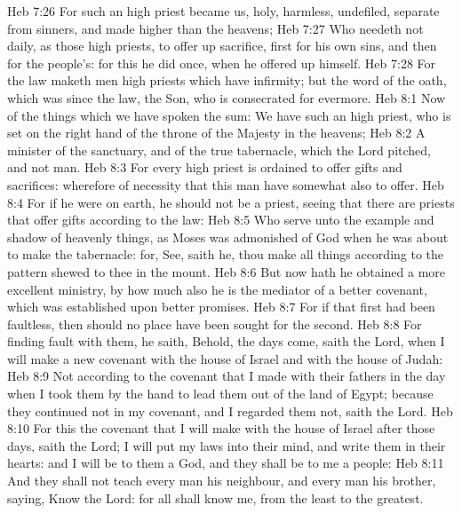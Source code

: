 \vs Heb 7:26 For such an high priest became us,  holy, harmless, undefiled, separate from sinners, and made higher than the heavens;
\vs Heb 7:27 Who needeth not daily, as those high priests, to offer up sacrifice, first for his own sins, and then for the people's: for this he did once, when he offered up himself.
\vs Heb 7:28 For the law maketh men high priests which have infirmity; but the word of the oath, which was since the law,  the Son, who is consecrated for evermore.
\vs Heb 8:1 Now of the things which we have spoken  the sum: We have such an high priest, who is set on the right hand of the throne of the Majesty in the heavens;
\vs Heb 8:2 A minister of the sanctuary, and of the true tabernacle, which the Lord pitched, and not man.
\vs Heb 8:3 For every high priest is ordained to offer gifts and sacrifices: wherefore  of necessity that this man have somewhat also to offer.
\vs Heb 8:4 For if he were on earth, he should not be a priest, seeing that there are priests that offer gifts according to the law:
\vs Heb 8:5 Who serve unto the example and shadow of heavenly things, as Moses was admonished of God when he was about to make the tabernacle: for, See, saith he,  thou make all things according to the pattern shewed to thee in the mount.
\vs Heb 8:6 But now hath he obtained a more excellent ministry, by how much also he is the mediator of a better covenant, which was established upon better promises.
\vs Heb 8:7 For if that first  had been faultless, then should no place have been sought for the second.
\vs Heb 8:8 For finding fault with them, he saith, Behold, the days come, saith the Lord, when I will make a new covenant with the house of Israel and with the house of Judah:
\vs Heb 8:9 Not according to the covenant that I made with their fathers in the day when I took them by the hand to lead them out of the land of Egypt; because they continued not in my covenant, and I regarded them not, saith the Lord.
\vs Heb 8:10 For this  the covenant that I will make with the house of Israel after those days, saith the Lord; I will put my laws into their mind, and write them in their hearts: and I will be to them a God, and they shall be to me a people:
\vs Heb 8:11 And they shall not teach every man his neighbour, and every man his brother, saying, Know the Lord: for all shall know me, from the least to the greatest.
